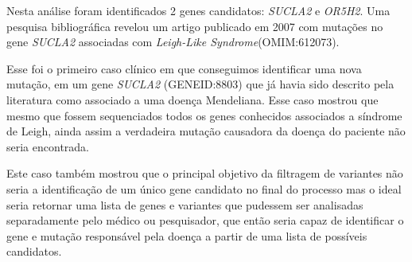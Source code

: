 

Nesta análise foram identificados 2 genes candidatos: \textit{SUCLA2} e \textit{OR5H2}. Uma pesquisa bibliográfica revelou um artigo publicado em 2007 \cite{Carrozzo2007} com mutações no gene \textit{SUCLA2} associadas com \textit{Leigh-Like Syndrome}(OMIM:612073).

Esse foi o primeiro caso clínico em que conseguimos identificar uma nova mutação, em um gene \textit{SUCLA2} (GENEID:8803) que já havia sido descrito pela literatura como associado a uma doença Mendeliana. Esse caso mostrou que mesmo que fossem sequenciados todos os genes conhecidos associados a síndrome de Leigh, ainda assim a verdadeira mutação causadora da doença do paciente não seria encontrada.

Este caso também mostrou que o principal objetivo da filtragem de variantes não seria a identificação de um único gene candidato no final do processo mas o ideal seria retornar uma lista de genes e variantes que pudessem ser analisadas separadamente pelo médico ou pesquisador, que então seria capaz de identificar o gene e mutação responsável pela doença a partir de uma lista de possíveis candidatos.

